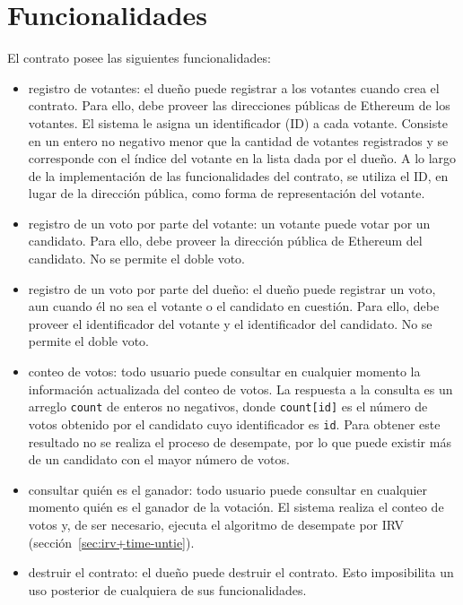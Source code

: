 \section{Funcionalidades}
El contrato posee las siguientes funcionalidades:
\begin{itemize}
    \item registro de votantes: el due\~no puede registrar a los votantes cuando crea el contrato. Para ello, debe proveer las direcciones p\'ublicas de Ethereum de los votantes. El sistema le asigna un identificador (ID) a cada votante. Consiste en un entero no negativo menor que la cantidad de votantes registrados y se corresponde con el \'indice del votante en la lista dada por el due\~no. A lo largo de la implementaci\'on de las funcionalidades del contrato, se utiliza el ID, en lugar de la direcci\'on p\'ublica, como forma  de representaci\'on del votante. 
    \item registro de un voto por parte del votante: un votante puede votar por un candidato. Para ello, debe proveer la direcci\'on p\'ublica de Ethereum del candidato. No se permite el doble voto.
    \item registro de un voto por parte del due\~no: el due\~no puede registrar un voto, aun cuando \'el no sea el votante o el candidato en cuesti\'on. Para ello, debe proveer el identificador del votante y el identificador del candidato. No se permite el doble voto.
    \item conteo de votos: todo usuario puede consultar en cualquier momento la informaci\'on actualizada del conteo de votos.  La respuesta a la consulta es un arreglo \lstinline{count} de enteros no negativos, donde \lstinline{count[id]} es el n\'umero de votos obtenido por el candidato cuyo identificador es \lstinline{id}. Para obtener este resultado no se realiza el proceso de desempate, por lo que puede existir m\'as de un candidato con el mayor n\'umero de votos.  
    \item consultar qui\'en es el ganador:  todo usuario puede consultar en cualquier momento qui\'en es el ganador de la votaci\'on. El sistema realiza el conteo de votos y, de ser necesario, ejecuta el algoritmo de desempate por IRV (secci\'on~\ref{sec:irv+time-untie}). 
    \item destruir el contrato: el due\~no puede destruir el contrato. Esto imposibilita un uso posterior de cualquiera de sus funcionalidades. 
\end{itemize}

